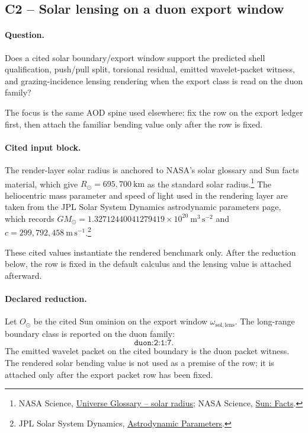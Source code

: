 \subsection{C2 -- Solar lensing on a duon export window}\label{suppc:c2-solar-lensing}
\paragraph{Question.} Does a cited solar boundary/export window support the predicted shell qualification, push/pull split, torsional residual, emitted wavelet-packet witness, and grazing-incidence lensing rendering when the export class is read on the duon family?

The focus is the same AOD spine used elsewhere: fix the row on the export ledger first, then attach the familiar bending value only after the row is fixed.

\paragraph{Cited input block.} The render-layer solar radius is anchored to NASA's solar glossary and Sun facts material, which give $R_\odot = 695{,}700\ \mathrm{km}$ as the standard solar radius.\footnote{NASA Science, \href{https://science.nasa.gov/universe/glossary/}{Universe Glossary -- solar radius}; NASA Science, \href{https://science.nasa.gov/sun/facts/}{Sun: Facts}.} The heliocentric mass parameter and speed of light used in the rendering layer are taken from the JPL Solar System Dynamics astrodynamic parameters page, which records $GM_\odot = 1.32712440041279419\times 10^{20}\ \mathrm{m^3\,s^{-2}}$ and $c=299{,}792{,}458\ \mathrm{m\,s^{-1}}$.\footnote{JPL Solar System Dynamics, \href{https://ssd.jpl.nasa.gov/astro_par.html}{Astrodynamic Parameters}.}

These cited values instantiate the rendered benchmark only. After the reduction below, the row is fixed in the default calculus and the lensing value is attached afterward.

\paragraph{Declared reduction.} Let $O_\odot$ be the cited Sun ominion on the export window $\omega_{\mathrm{sol,lens}}$. The long-range boundary class is reported on the duon family:
\[
\texttt{duon:2:1:7}.
\]
The emitted wavelet packet on the cited boundary is the duon packet witness. The rendered solar bending value is not used as a premise of the row; it is attached only after the export packet row has been fixed.

